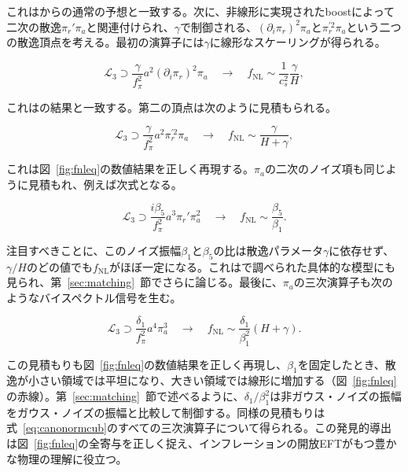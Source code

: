 \documentclass[a4paper,11pt]{ltjsarticle}
\numberwithin{equation}{section}
\def\pia{\pi_{a}}
\def\pir{\pi_{r}}
\newcommand{\Eq}[1]{Eq.~(\ref{#1})}
\newcommand{\Fig}[1]{Fig.~{\ref{#1}}}
\newcommand{\Sec}[1]{Sec.~\ref{#1}}
\renewcommand{\Eq}[1]{式~\eqref{#1}}
\renewcommand{\Fig}[1]{図~\ref{#1}}
\renewcommand{\Sec}[1]{第~\ref{#1}~節}
\begin{document}
これは\cite{Cheung:2007st}からの通常の予想と一致する。次に、非線形に実現されたboostによって二次の散逸$\pir'\pia$と関連付けられ、$\gamma$で制御される、$(\partial_i\pir)^2\pia$と$\pir^{\prime2}\pia$という二つの散逸頂点を考える。最初の演算子には$\gamma$に線形なスケーリングが得られる。

\begin{equation}
    \mathcal{L}_{3} \supset \frac{\gamma}{f_{\pi}^{2}}a^2(\partial_{i}\pir)^{2}\pia \quad \rightarrow \quad f_{\text{NL}}\sim \frac{1}{c_s^2} \frac{\gamma}{H} ,
\end{equation}

これは\cite{LopezNacir:2011kk,Creminelli:2023aly}の結果と一致する。第二の頂点は次のように見積もられる。

\begin{equation}
    \mathcal{L}_{3} \supset \frac{\gamma}{f_{\pi}^{2}}a^2 \pir^{\prime 2}\pia \quad \rightarrow \quad f_{\text{NL}}\sim \frac{\gamma}{H+\gamma},
\end{equation}

これは\Fig{fig:fnleq}の数値結果を正しく再現する。$\pia$の二次のノイズ項も同じように見積もれ、例えば次式となる。

\begin{equation}
 \mathcal{L}_{3} \supset \frac{i\beta_{5}}{f_{\pi}^{2}}a^{3}\pir'\pia^{2} \quad \rightarrow \quad  f_{\text{NL}}\sim \frac{\beta_{5}}{\beta_{1}}.
\end{equation}

注目すべきことに、このノイズ振幅$\beta_1$と$\beta_5$の比は散逸パラメータ$\gamma$に依存せず、$\gamma/H$のどの値でも$f_{\text{NL}}$がほぼ一定になる。これは\cite{Creminelli:2023aly}で調べられた具体的な模型にも見られ、\Sec{sec:matching}でさらに論じる。最後に、$\pia$の三次演算子も次のようなバイスペクトル信号を生む。

\begin{equation}\label{eq:5thestimate}
     \mathcal{L}_{3} \supset \frac{\delta_{1}}{f_{\pi}^{2}}a^{4}\pia^{3} \quad \rightarrow \quad f_{\text{NL}}\sim \frac{\delta_{1}}{\beta^2_{1}} (H+\gamma).
 \end{equation}

この見積もりも\Fig{fig:fnleq}の数値結果を正しく再現し、$\beta_1$を固定したとき、散逸が小さい領域では平坦になり、大きい領域では線形に増加する（\Fig{fig:fnleq}の赤線）。\Sec{sec:matching}で述べるように、$\delta_1/\beta_1^2$は非ガウス・ノイズの振幅をガウス・ノイズの振幅と比較して制御する。同様の見積もりは\Eq{eq:canonormcub}のすべての三次演算子について得られる。この発見的導出は\Fig{fig:fnleq}の全寄与を正しく捉え、インフレーションの開放EFTがもつ豊かな物理の理解に役立つ。
\end{document}
